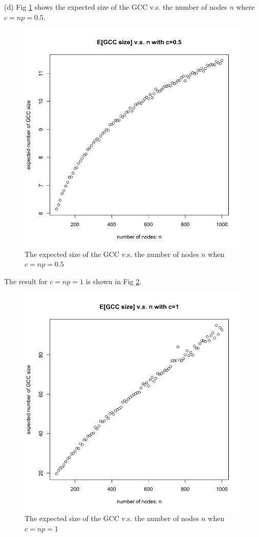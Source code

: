 \documentclass[draftcls,12pt,onecolumn]{IEEEtran}
\begin{document}
(d) Fig \ref{fig012} shows the expected size of the GCC v.s. the number of nodes $n$ where $c=np=0.5$. 
\begin{figure}[H]
\centering
\includegraphics[scale=0.3]{figures_part1_1/output_20_0.png}
\caption{The expected size of the GCC v.s. the number of nodes $n$ when $c=np=0.5$}
\label{fig012}
\end{figure}

The result for $c=np=1$ is shown in Fig \ref{fig013}.
\begin{figure}[H]
\centering
\includegraphics[scale=0.3]{figures_part1_1/output_22_0.png}
\caption{The expected size of the GCC v.s. the number of nodes $n$ when $c=np=1$}
\label{fig013}
\end{figure}
\end{document}
